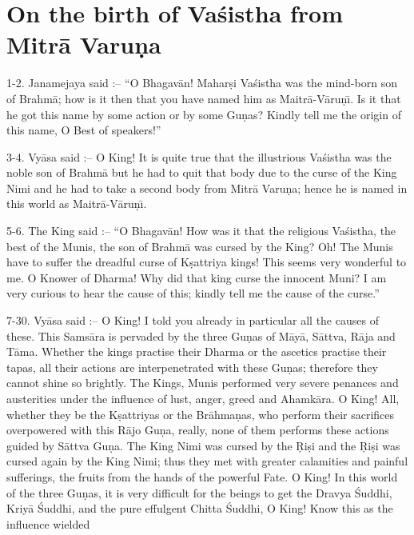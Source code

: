 \chapter{On the birth of Va\'sistha from Mitr\=a Varu\d{n}a}

1-2. Janamejaya said :-- ``O Bhagav\=an! Mahar\d{s}i Va\'sistha was the mind-born son of Brahm\=a; how is it then that you have named him as Maitr\=a-V\=aru\d{n}\={\i}. Is it that he got this name by some action or by some Gu\d{n}as? Kindly tell me the origin of this name, O Best of speakers!''

3-4. Vy\=asa said :-- O King! It is quite true that the illustrious Va\'sistha was the noble son of Brahm\=a but he had to quit that body due to the curse of the King Nimi and he had to take a second body from Mitr\=a Varu\d{n}a; hence he is named in this world as Maitr\=a-V\=aru\d{n}\={\i}.

5-6. The King said :-- ``O Bhagav\=an! How was it that the religious Va\'sistha, the best of the Munis, the son of Brahm\=a was cursed by the King? Oh! The Munis have to suffer the dreadful curse of K\d{s}attriya kings! This seems very wonderful to me. O Knower of Dharma! Why did that king curse the innocent Muni? I am very curious to hear the cause of this; kindly tell me the cause of the curse.''

7-30. Vy\=asa said :-- O King! I told you already in particular all the causes of these. This Sams\=ara is pervaded by the three Gu\d{n}as of M\=ay\=a, S\=attva, R\=aja and T\=ama. Whether the kings practise their Dharma or the ascetics practise their tapas, all their actions are interpenetrated with these Gu\d{n}as; therefore they cannot shine so brightly. The Kings, Munis performed very severe penances and austerities under the influence of lust, anger, greed and Ahamk\=ara. O King! All, whether they be the K\d{s}attriyas or the Br\=ahma\d{n}as, who perform their sacrifices overpowered with this R\=ajo Gu\d{n}a, really, none of them performs these actions guided by S\=attva Gu\d{n}a. The King Nimi was cursed by the \d{R}i\d{s}i and the \d{R}i\d{s}i was cursed again by the King Nimi; thus they met with greater calamities and painful sufferings, the fruits from the hands of the powerful Fate. O King! In this world of the three Gu\d{n}as, it is very difficult for the beings to get the Dravya \'Suddhi, Kriy\=a \'Suddhi, and the pure effulgent Chitta \'Suddhi, O King! Know this as the influence wielded

